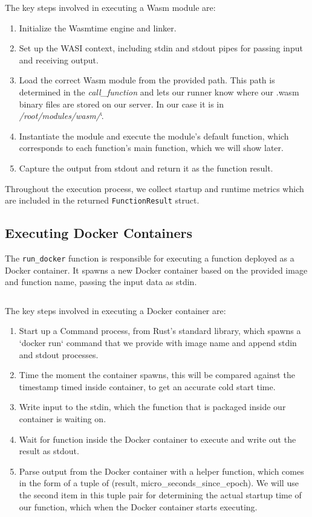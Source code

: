 \documentclass[
  table]{report}
\begin{document}
\inputminted{rust}{assets/code/wasm_runner.rs}

The key steps involved in executing a Wasm module are:

\renewcommand{\theenumi}{1.\arabic{enumi}}
\begin{enumerate}
  \item Initialize the Wasmtime engine and linker.
  \item Set up the WASI context, including stdin and stdout pipes for passing input and receiving output.
  \item Load the correct Wasm module from the provided path. This path is determined in the \textit{call\_function} and lets our runner know where our .wasm binary files are stored on our server. In our case it is in \textit{/root/modules/wasm/}`.
  \item Instantiate the module and execute the module's default function, which corresponds to each function's main function, which we will show later.
  \item Capture the output from stdout and return it as the function result.
\end{enumerate}

Throughout the execution process, we collect startup and runtime metrics
which are included in the returned \texttt{FunctionResult} struct.

\subsection{Executing Docker Containers}
\label{sect:execute_docker}

The \texttt{run\_docker} function is responsible for executing a
function deployed as a Docker container. It spawns a new Docker
container based on the provided image and function name, passing the
input data as stdin.

\inputminted{rust}{assets/code/docker_runner.rs}

The key steps involved in executing a Docker container are:

\renewcommand{\theenumi}{2.\arabic{enumi}}
\begin{enumerate}
  \item Start up a Command process, from Rust's standard library, which spawns a `docker run` command that we provide with image name and append stdin and stdout processes. 
  \item Time the moment the container spawns, this will be compared against the timestamp timed inside container, to get an accurate cold start time.
  \item Write input to the stdin, which the function that is packaged inside our container is waiting on.
  \item Wait for function inside the Docker container to execute and write out the result as stdout.
  \item Parse output from the Docker container with a helper function, which comes in the form of a tuple of (result, micro\_seconds\_since\_epoch). We will use the second item in this tuple pair for determining the actual startup time of our function, which when the Docker container starts executing.
\end{enumerate}
\end{document}
